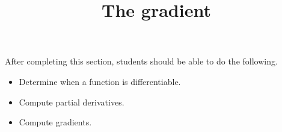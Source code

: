 \documentclass{ximera}
\title{The gradient}
\begin{document}
\begin{abstract}
\end{abstract}

\maketitle

\begin{sectionOutcomes}

After completing this section, students should be able to do the following.

\begin{itemize}
\item Determine when a function is differentiable.
\item Compute partial derivatives.
\item Compute gradients.
\end{itemize}

\end{sectionOutcomes}
\end{document}
